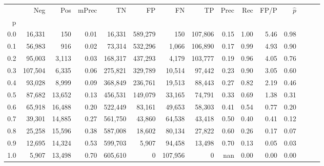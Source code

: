 \begin{tabular}{rrrrrrrrrrrrrrr}
\toprule
{} &      Neg &     Pos & mPrec &       TN &       FP &       FN &       TP &  Prec &   Rec &  FP/P & $\hat{p}$ \\
p   &          &         &       &          &          &          &          &       &       &       &           \\
\midrule
0.0 &   16,331 &     150 &  0.01 &   16,331 &  589,279 &      150 &  107,806 &  0.15 &  1.00 &  5.46 &      0.98 \\
0.1 &   56,983 &     916 &  0.02 &   73,314 &  532,296 &    1,066 &  106,890 &  0.17 &  0.99 &  4.93 &      0.90 \\
0.2 &   95,003 &   3,113 &  0.03 &  168,317 &  437,293 &    4,179 &  103,777 &  0.19 &  0.96 &  4.05 &      0.76 \\
0.3 &  107,504 &   6,335 &  0.06 &  275,821 &  329,789 &   10,514 &   97,442 &  0.23 &  0.90 &  3.05 &      0.60 \\
0.4 &   93,028 &   8,999 &  0.09 &  368,849 &  236,761 &   19,513 &   88,443 &  0.27 &  0.82 &  2.19 &      0.46 \\
0.5 &   87,682 &  13,652 &  0.13 &  456,531 &  149,079 &   33,165 &   74,791 &  0.33 &  0.69 &  1.38 &      0.31 \\
0.6 &   65,918 &  16,488 &  0.20 &  522,449 &   83,161 &   49,653 &   58,303 &  0.41 &  0.54 &  0.77 &      0.20 \\
0.7 &   39,301 &  14,885 &  0.27 &  561,750 &   43,860 &   64,538 &   43,418 &  0.50 &  0.40 &  0.41 &      0.12 \\
0.8 &   25,258 &  15,596 &  0.38 &  587,008 &   18,602 &   80,134 &   27,822 &  0.60 &  0.26 &  0.17 &      0.07 \\
0.9 &   12,695 &  14,324 &  0.53 &  599,703 &    5,907 &   94,458 &   13,498 &  0.70 &  0.13 &  0.05 &      0.03 \\
1.0 &    5,907 &  13,498 &  0.70 &  605,610 &        0 &  107,956 &        0 &   nan &  0.00 &  0.00 &      0.00 \\
\bottomrule
\end{tabular}
